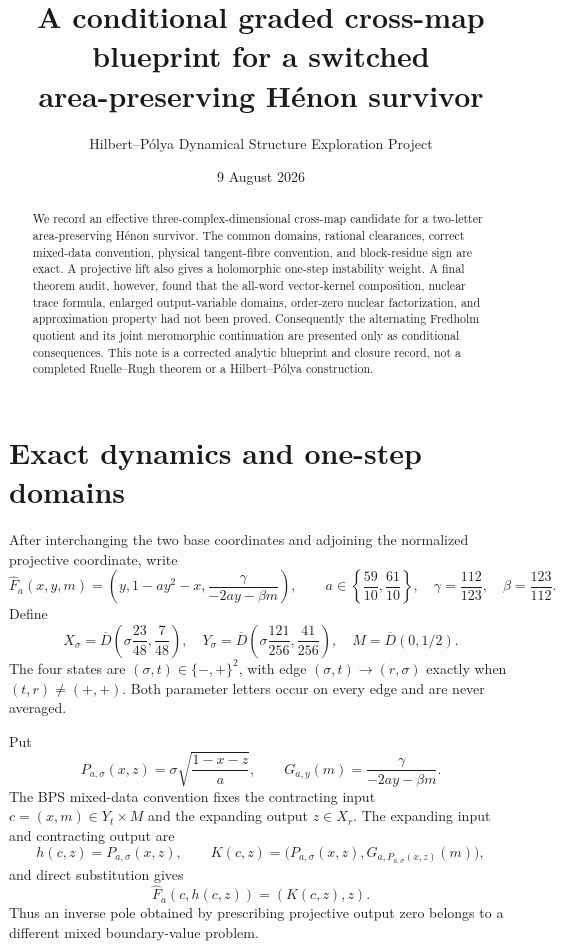 \documentclass[11pt]{article}
\title{A conditional graded cross-map blueprint for a switched\\
area-preserving H\'enon survivor}
\author{Hilbert--P\'olya Dynamical Structure Exploration Project}
\date{9 August 2026}
\begin{document}
\maketitle

\begin{abstract}
We record an effective three-complex-dimensional cross-map candidate for a
two-letter area-preserving H\'enon survivor.  The common domains, rational
clearances, correct mixed-data convention, physical tangent-fibre convention,
and block-residue sign are exact.  A projective lift also gives a holomorphic
one-step instability weight.  A final theorem audit, however, found that the
all-word vector-kernel composition, nuclear trace formula, enlarged
output-variable domains, order-zero nuclear factorization, and approximation
property had not been proved.  Consequently the alternating Fredholm quotient
and its joint meromorphic continuation are presented only as conditional
consequences.  This note is a corrected analytic blueprint and closure record,
not a completed Ruelle--Rugh theorem or a Hilbert--P\'olya construction.
\end{abstract}

\section{Exact dynamics and one-step domains}

After interchanging the two base coordinates and adjoining the normalized
projective coordinate, write
\begin{equation}\label{eq:lift}
 \widehat F_a(x,y,m)=
 \left(y,1-ay^2-x,\frac{\gamma}{-2ay-\beta m}\right),
 \qquad
 a\in\left\{\frac{59}{10},\frac{61}{10}\right\},
 \quad \gamma=\frac{112}{123},\quad\beta=\frac{123}{112}.
\end{equation}
Define
\[
 X_\sigma=\overline D\left(\sigma\frac{23}{48},\frac7{48}\right),
 \quad
 Y_\sigma=\overline D\left(\sigma\frac{121}{256},\frac{41}{256}\right),
 \quad M=\overline D(0,1/2).
\]
The four states are $(\sigma,t)\in\{-,+\}^2$, with edge
$(\sigma,t)\to(r,\sigma)$ exactly when $(t,r)\ne(+,+)$.  Both parameter
letters occur on every edge and are never averaged.

Put
\[
 P_{a,\sigma}(x,z)=\sigma\sqrt{\frac{1-x-z}{a}},
 \qquad
 G_{a,y}(m)=\frac{\gamma}{-2ay-\beta m}.
\]
The BPS mixed-data convention \cite{BPS2003} fixes the contracting input
$c=(x,m)\in Y_t\times M$ and the expanding output $z\in X_r$.  The expanding
input and contracting output are
\[
 h(c,z)=P_{a,\sigma}(x,z),\qquad
 K(c,z)=\bigl(P_{a,\sigma}(x,z),G_{a,P_{a,\sigma}(x,z)}(m)\bigr),
\]
and direct substitution gives
\begin{equation}\label{eq:cross}
 \widehat F_a(c,h(c,z))=(K(c,z),z).
\end{equation}
Thus an inverse pole obtained by prescribing projective output zero belongs
to a different mixed boundary-value problem.
\end{document}
